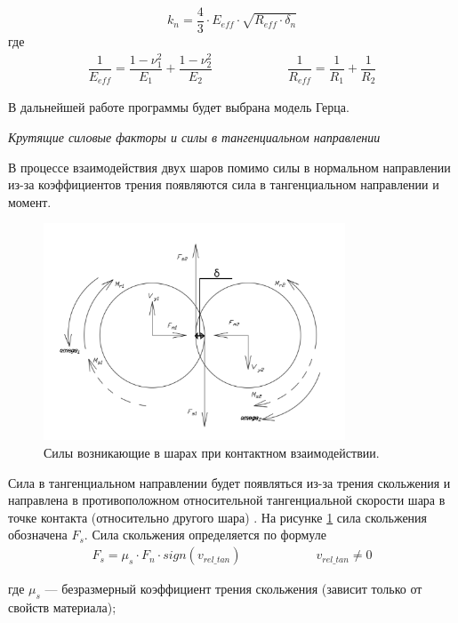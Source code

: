 \documentclass[utf8x, 14pt, oneside, a4paper]{article}
\begin{document}
\begin{equation}
\label{kn_herz}
k_n = \frac{4}{3} \cdot E_{eff} \cdot \sqrt{R_{eff} \cdot \delta_n}
\end{equation}
где 
\begin{align}
\dfrac{1}{E_{eff}} = \dfrac{1 - \nu_1^2}{E_1} + \dfrac{1 - \nu_2^2}{E_2} \qquad \qquad \qquad \dfrac{1}{R_{eff}} = \dfrac{1}{R_1} + \dfrac{1}{R_2}
\end{align}


В дальнейшей работе программы будет выбрана модель Герца.


\textit{Крутящие силовые факторы и силы в тангенциальном направлении}
\label{angular_subsection}


В процессе взаимодействия двух шаров помимо силы в нормальном направлении из-за коэффициентов трения появляются сила в тангенциальном направлении и момент.

\begin{figure}[h!]
	\centering
	\includegraphics[width=0.8\textwidth]{sily}
	\caption{Силы возникающие в шарах при контактном взаимодействии.}
	\label{pic:sily}
\end{figure} 

Сила в тангенциальном направлении будет появляться из-за трения скольжения и направлена в противоположном относительной тангенциальной скорости шара в точке контакта (относительно другого шара) \cite{friction_calibration}. На рисунке \ref{pic:sily} сила скольжения обозначена $F_s$. Сила скольжения определяется по формуле
\begin{align}
\label{sliding_force}
F_s = \mu_s \cdot F_n \cdot sign(v_{rel\_tan}) \qquad \qquad \qquad v_{rel\_tan} \neq 0
\end{align}

где $\mu_s$ --- безразмерный коэффициент трения скольжения (зависит только от свойств материала);
\end{document}
